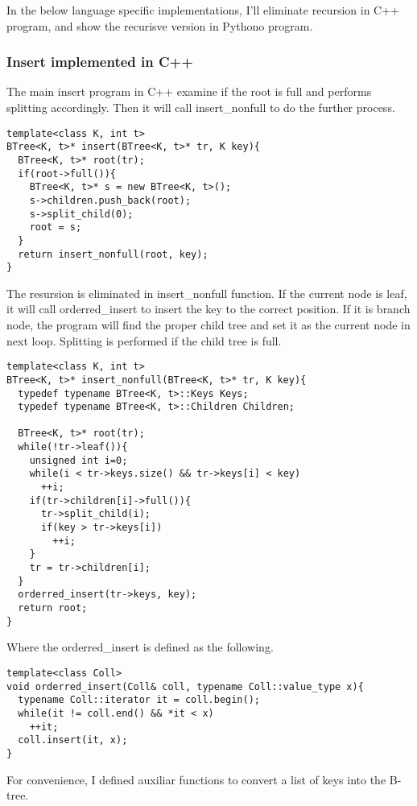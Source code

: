 \documentclass{article}
\begin{document}
In the below language specific implementations, I'll eliminate recursion in 
C++ program, and show the recurisve version in Pythono program.

\subsubsection*{Insert implemented in C++}
The main insert program in C++ examine if the root is full and performs splitting
accordingly. Then it will call insert\_nonfull to do the further process.

\lstset{language=C++}
\begin{lstlisting}
template<class K, int t>
BTree<K, t>* insert(BTree<K, t>* tr, K key){
  BTree<K, t>* root(tr);
  if(root->full()){
    BTree<K, t>* s = new BTree<K, t>();
    s->children.push_back(root);
    s->split_child(0);
    root = s;
  }
  return insert_nonfull(root, key);
}
\end{lstlisting}

The resursion is eliminated in insert\_nonfull function. If the current
node is leaf, it will call orderred\_insert to insert the key to the correct
position. If it is branch node, the program will find the proper child
tree and set it as the current node in next loop. Splitting is performed
if the child tree is full.

\begin{lstlisting}
template<class K, int t>
BTree<K, t>* insert_nonfull(BTree<K, t>* tr, K key){
  typedef typename BTree<K, t>::Keys Keys;
  typedef typename BTree<K, t>::Children Children;

  BTree<K, t>* root(tr);
  while(!tr->leaf()){
    unsigned int i=0;
    while(i < tr->keys.size() && tr->keys[i] < key)
      ++i;
    if(tr->children[i]->full()){
      tr->split_child(i);
      if(key > tr->keys[i])
        ++i;
    }
    tr = tr->children[i];
  }
  orderred_insert(tr->keys, key);
  return root;
}
\end{lstlisting}

Where the orderred\_insert is defined as the following.

\begin{lstlisting}
template<class Coll>
void orderred_insert(Coll& coll, typename Coll::value_type x){
  typename Coll::iterator it = coll.begin();
  while(it != coll.end() && *it < x)
    ++it;
  coll.insert(it, x);
}
\end{lstlisting}

For convenience, I defined auxiliar functions to convert a
list of keys into the B-tree.
\end{document}
